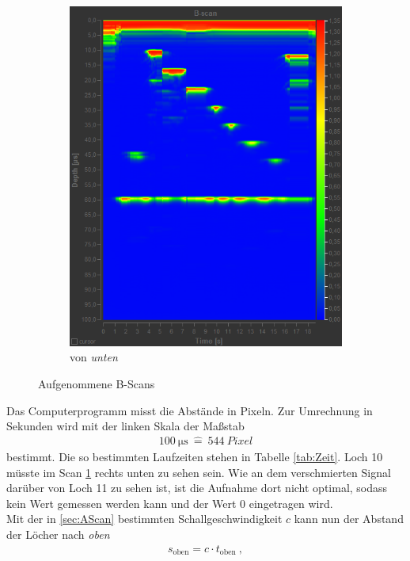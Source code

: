 \begin{figure}[h!]
\begin{subfigure}{.45\textwidth}
		\includegraphics[width=\textwidth]{unten.png}
		\caption{von \emph{unten}}
		\label{fig:unten}
	\end{subfigure}
	\caption{Aufgenommene B-Scans}
	\label{fig:BScan}
\end{figure}
Das Computerprogramm misst die Abstände in Pixeln. Zur Umrechnung in Sekunden wird mit der linken Skala der Maßstab
\begin{align}
	\SI{100}{\micro\second} \ \widehat{=} \ \SI{544}{Pixel}
\end{align}
bestimmt. Die so bestimmten Laufzeiten stehen in Tabelle \ref{tab:Zeit}. Loch 10 müsste im Scan \ref{fig:unten} rechts unten zu sehen sein. Wie an dem verschmierten Signal darüber von Loch 11 zu sehen ist, ist die Aufnahme dort nicht optimal, sodass kein Wert gemessen werden kann und der Wert 0 eingetragen wird.
 \\
Mit der in \ref{sec:AScan} bestimmten Schallgeschwindigkeit $c$ kann nun der Abstand der Löcher nach \emph{oben}
\begin{align}
	s_\text{oben} = c \cdot t_\text{oben} \ ,
\end{align}
